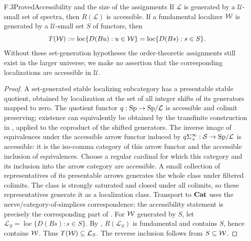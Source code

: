 \begin{claim}{F.3}{Proved}{Accessibility and the size of the assignments}
If $\mathcal L$ is generated by a $\mathcal U$-small set of spectra, then
$R(\mathcal L)$ is accessible. If a fundamental localizer $\mathcal{W}$ is generated
by a $\mathcal U$-small set $S$ of functors, then
\[
 T(\mathcal{W}):=\operatorname{loc}\{D(Bu):u\in\mathcal{W}\}
       =\operatorname{loc}\{D(Bs):s\in S\}.
\]
Without these set-generation hypotheses the order-theoretic assignments
still exist in the larger universe; we make no assertion that the
corresponding localizations are accessible in $\mathcal U$.
\end{claim}
\begin{proof}
A set-generated stable localizing subcategory has a presentable stable
quotient, obtained by localization at the set of all integer shifts of its
generators mapped to zero. The quotient functor $q:\mathrm{Sp}\to\mathrm{Sp}/\mathcal L$
is accessible and colimit preserving; existence can equivalently be
obtained by the transfinite construction in
\citet[Theorem 3.7]{FCasacubertaGutierrezRosicky2014}, applied to the
coproduct of the shifted generators. The inverse image of equivalences
under the accessible arrow functor induced by
$q\Sigma^\infty_+:\mathcal{S}\to\mathrm{Sp}/\mathcal L$ is accessible: it is the
iso-comma category of this arrow functor and the accessible inclusion of
equivalences. Choose a regular cardinal for which this category and its
inclusion into the arrow category are accessible. A small collection of
representatives of its presentable arrows generates the whole class under
filtered colimits. The class is strongly saturated and closed under all
colimits, so these representatives generate it as a localization class.
Transport to $\mathbf{Cat}$ uses the nerve/category-of-simplices correspondence;
the accessibility statement is precisely the corresponding part of
\citet[Theorem 4.2.15]{RootCisinski2006}. For $\mathcal{W}$ generated by $S$, let
$\mathcal L_S=\operatorname{loc}\{D(Bs):s\in S\}$. By ,
$R(\mathcal L_S)$ is fundamental and contains $S$, hence contains $\mathcal{W}$.
Thus $T(\mathcal{W})\subseteq\mathcal L_S$. The reverse inclusion follows from
$S\subseteq\mathcal{W}$.
\end{proof}

